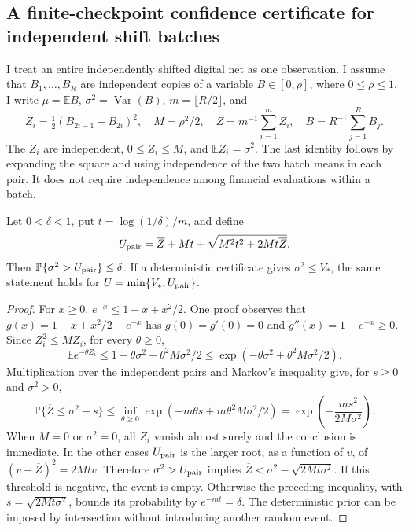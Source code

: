 \subsection{A finite-checkpoint confidence certificate for independent shift batches}
\label{sec:rqmc-confidence-certificate}

I treat an entire independently shifted digital net as one observation. I assume
that $B_1,\ldots,B_R$ are independent copies of a variable $B\in[0,\rho]$, where
$0\leq\rho\leq1$. I write $\mu=\mathbb E B$, $\sigma^2=\operatorname{Var}(B)$,
$m=\lfloor R/2\rfloor$, and
\[
 Z_i=\tfrac12(B_{2i-1}-B_{2i})^2,\quad
 M=\rho^2/2,\quad
 \overline Z=m^{-1}\sum_{i=1}^m Z_i,\quad
 \overline B=R^{-1}\sum_{j=1}^R B_j.
\]
The $Z_i$ are independent, $0\leq Z_i\leq M$, and
$\mathbb E Z_i=\sigma^2$. The last identity follows by expanding the square
and using independence of the two batch means in each pair. It does not require
independence among financial evaluations within a batch.

\begin{lemma}
\label{lem:rqmc-pair-variance}
Let $0<\delta<1$, put $t=\log(1/\delta)/m$, and define
\[
 U_{\rm pair}=\overline Z+Mt+
       \sqrt{M^2t^2+2Mt\overline Z}.
\]
Then $\mathbb P\{\sigma^2>U_{\rm pair}\}\leq\delta$.
If a deterministic certificate gives $\sigma^2\leq V_*$, the same statement
holds for $U=\min\{V_*,U_{\rm pair}\}$.
\end{lemma}

\begin{proof}
For $x\geq0$, $e^{-x}\leq1-x+x^2/2$. One proof observes that
$g(x)=1-x+x^2/2-e^{-x}$ has $g(0)=g'(0)=0$ and
$g''(x)=1-e^{-x}\geq0$. Since $Z_i^2\leq MZ_i$, for every $\theta\geq0$,
\[
 \mathbb E e^{-\theta Z_i}
 \leq1-\theta\sigma^2+\theta^2M\sigma^2/2
 \leq\exp(-\theta\sigma^2+\theta^2M\sigma^2/2).
\]
Multiplication over the independent pairs and Markov's inequality give, for
$s\geq0$ and $\sigma^2>0$,
\[
 \mathbb P\{\overline Z\leq\sigma^2-s\}
 \leq\inf_{\theta\geq0}
       \exp(-m\theta s+m\theta^2M\sigma^2/2)
 =\exp\!\left(-\frac{ms^2}{2M\sigma^2}\right).
\]
When $M=0$ or $\sigma^2=0$, all $Z_i$ vanish almost surely and the conclusion
is immediate. In the other cases $U_{\rm pair}$ is the larger root, as a
function of $v$, of $(v-\overline Z)^2=2Mtv$. Therefore
$\sigma^2>U_{\rm pair}$ implies
$\overline Z<\sigma^2-\sqrt{2Mt\sigma^2}$. If this threshold is negative,
the event is empty. Otherwise the preceding inequality, with
$s=\sqrt{2Mt\sigma^2}$, bounds its probability by $e^{-mt}=\delta$.
The deterministic prior can be imposed by intersection without introducing
another random event.
\end{proof}

